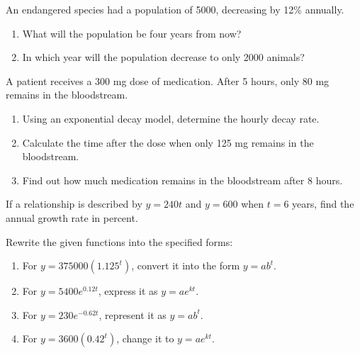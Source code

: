 \begin{puzzle}
    An endangered species had a population of 5000, decreasing by 12\% annually.
    \begin{enumerate}
        \item What will the population be four years from now?
        \item In which year will the population decrease to only 2000 animals?
    \end{enumerate}
\end{puzzle}

\begin{puzzle}
    A patient receives a 300 mg dose of medication. After 5 hours, only 80 mg remains in the bloodstream.
    \begin{enumerate}
        \item Using an exponential decay model, determine the hourly decay rate.
        \item Calculate the time after the dose when only 125 mg remains in the bloodstream.
        \item Find out how much medication remains in the bloodstream after 8 hours.
    \end{enumerate}
\end{puzzle}

\begin{puzzle}
    If a relationship is described by \( y = 240t \) and \( y = 600 \) when \( t = 6 \) years, find the annual growth rate in percent.
\end{puzzle}

\begin{puzzle}
    Rewrite the given functions into the specified forms:
    \begin{enumerate}
        \item For \( y = 375000(1.125^t) \), convert it into the form \( y = ab^t \).
        \item For \( y = 5400e^{0.12t} \), express it as \( y = ae^{kt} \).
        \item For \( y = 230e^{-0.62t} \), represent it as \( y = ab^t \).
        \item For \( y = 3600(0.42^t) \), change it to \( y = ae^{kt} \).
    \end{enumerate}
\end{puzzle}


